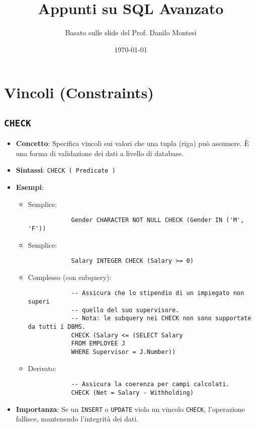 \documentclass{article}
\title{Appunti su SQL Avanzato}
\author{Basato sulle slide del Prof. Danilo Montesi}
\date{\today}
\begin{document}
	
	\maketitle
	\tableofcontents
	\newpage
	
	\section{Vincoli (Constraints)}
	
	\subsection{\texttt{CHECK}}
	\begin{itemize}
		\item \textbf{Concetto}: Specifica vincoli sui valori che una tupla (riga) può assumere. È una forma di validazione dei dati a livello di database.
		\item \textbf{Sintassi}: \texttt{CHECK ( Predicate )}
		\item \textbf{Esempi}:
		\begin{itemize}
			\item Semplice:
			\begin{verbatim}
			Gender CHARACTER NOT NULL CHECK (Gender IN ('M', 'F'))
			\end{verbatim}
			\item Semplice:
			\begin{verbatim}
			Salary INTEGER CHECK (Salary >= 0)
			\end{verbatim}
			\item Complesso (con subquery):
			\begin{verbatim}
			-- Assicura che lo stipendio di un impiegato non superi
			-- quello del suo supervisore.
			-- Nota: le subquery nei CHECK non sono supportate da tutti i DBMS.
			CHECK (Salary <= (SELECT Salary
			FROM EMPLOYEE J
			WHERE Supervisor = J.Number))
			\end{verbatim}
			\item Derivato:
			\begin{verbatim}
			-- Assicura la coerenza per campi calcolati.
			CHECK (Net = Salary - Withholding)
			\end{verbatim}
		\end{itemize}
		\item \textbf{Importanza}: Se un \texttt{INSERT} o \texttt{UPDATE} viola un vincolo \texttt{CHECK}, l'operazione fallisce, mantenendo l'integrità dei dati.
	\end{itemize}
	
\end{document}
